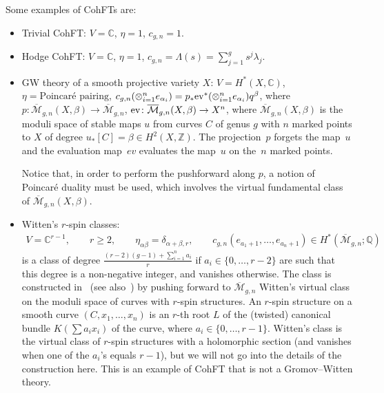 \documentclass[pdftex]{sigma}
\numberwithin{equation}{section}
\newcommand{\mbZ}{\mathbb Z}
\newcommand{\mbC}{\mathbb C}
\newcommand{\oM}{\overline{\mathcal M}}
\def\mbQ{{\mathbb Q}}
\newcommand{\<}{\left<}
\renewcommand{\>}{\right>}
\begin{document}
Some examples of CohFTs are:
\begin{itemize}\itemsep=0pt
\item Trivial CohFT: $V=\mbC$, $\eta = 1$, $c_{g,n} = 1$.

\item Hodge CohFT: $V=\mbC$, $\eta=1$, $c_{g,n} = \Lambda(s) = \sum\limits_{j=1}^g s^j \lambda_j$.

\item GW theory of a smooth projective variety $X$: $V=H^*(X,\mbC)$, $\eta = \text{Poincar\'e pairing}$, $c_{g,n}(\otimes_{i=1}^n e_{\alpha_i}) = p_* {\rm ev}^* (\otimes_{i=1}^n e_{\alpha_i}) q^\beta$, where $p\colon \oM_{g,n}(X,\beta)\to\oM_{g,n}$, ${\rm ev}\colon \oM_{g,n}(X,\beta)\to X^n$,
where $\oM_{g,n}(X,\beta)$ is the moduli space of stable maps $u$ from curves $C$ of genus $g$ with $n$ marked points to $X$ of degree $u_*[C]=\beta\in H^2(X,\mbZ)$. The projection~$p$ forgets the map~$u$ and the evaluation map~$ev$ evaluates the map~$u$ on the~$n$ marked points.

Notice that, in order to perform the pushforward along $p$, a notion of Poincar\'e duality must be used, which involves the virtual fundamental class of $\oM_{g,n}(X,\beta)$.

\item Witten's $r$-spin classes:
\begin{gather*}V=\mbC^{r-1},\qquad r\geq 2,\qquad \eta_{\alpha\beta}=\delta_{\alpha+\beta,r},
\qquad c_{g,n}(e_{a_1+1},\dots,e_{a_n+1}) \in H^*(\oM_{g,n};\mbQ) \end{gather*}
is a class of degree $\frac{(r-2)(g-1)+\sum\limits_{i=1}^n a_i}{r}$ if $a_i\in\{0,\dots,r-2\}$ are such that this degree is a non-negative integer, and vanishes otherwise. The class is constructed in~\cite{PV00} (see also~\cite{Ch06}) by pushing forward to $\oM_{g,n}$ Witten's virtual class on the moduli space of curves with $r$-spin structures. An $r$-spin structure on a smooth curve $(C,x_1,\dots,x_n)$ is an $r$-th root $L$ of the (twisted) canonical bundle $K(\sum a_i x_i)$ of the curve, where $a_i\in\{0,\dots,r-1\}$. Witten's class is the virtual class of $r$-spin structures with a holomorphic section (and vanishes when one of the $a_i$'s equals $r-1$), but we will not go into the details of the construction here. This is an example of CohFT that is not a Gromov--Witten theory.


\end{itemize}
\end{document}
